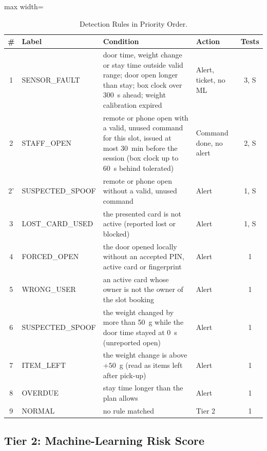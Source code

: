 \documentclass[sigconf,screen]{acmart}
\begin{document}
\begin{table}[tbp]
\centering
\footnotesize
\caption{Detection Rules in Priority Order.}
\label{tab:rules}
\begin{adjustbox}{max width=\textwidth}
\begin{tabular}{c l p{10.6cm} l c}
\toprule
\# & Label & Condition & Action & Tests \\
\midrule
1 & SENSOR\_FAULT & door time, weight change or stay time outside valid range; door open longer than stay; box clock over 300~s ahead; weight calibration expired & Alert, ticket, no ML & 3, S \\[2pt]
2 & STAFF\_OPEN & remote or phone open with a valid, unused command for this slot, issued at most 30~min before the session (box clock up to 60~s behind tolerated) & Command done, no alert & 2, S \\[2pt]
2' & SUSPECTED\_SPOOF & remote or phone open without a valid, unused command & Alert & 1, S \\[2pt]
3 & LOST\_CARD\_USED & the presented card is not active (reported lost or blocked) & Alert & 1, S \\[2pt]
4 & FORCED\_OPEN & the door opened locally without an accepted PIN, active card or fingerprint & Alert & 1 \\[2pt]
5 & WRONG\_USER & an active card whose owner is not the owner of the slot booking & Alert & 1 \\[2pt]
6 & SUSPECTED\_SPOOF & the weight changed by more than 50~g while the door time stayed at 0~s (unreported open) & Alert & 1 \\[2pt]
7 & ITEM\_LEFT & the weight change is above $+50$~g (read as items left after pick-up) & Alert & 1 \\[2pt]
8 & OVERDUE & stay time longer than the plan allows & Alert & 1 \\[2pt]
9 & NORMAL & no rule matched & Tier 2 & 1 \\
\bottomrule
\end{tabular}
\end{adjustbox}
\end{table}

\subsection{Tier 2: Machine-Learning Risk Score}
\end{document}
